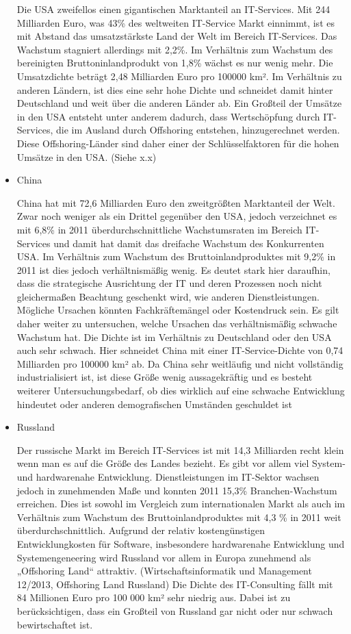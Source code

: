 \begin{itemize}
Die USA zweifellos einen gigantischen Marktanteil an IT-Services. Mit 244 Milliarden Euro, was 43\% des weltweiten IT-Service Markt einnimmt, ist es mit Abstand das umsatzstärkste Land der Welt im Bereich IT-Services. \cite{ibisUSA} Das Wachstum stagniert allerdings mit 2,2\%. Im Verhältnis zum Wachstum des bereinigten Bruttoninlandprodukt von 1,8\% wächst es nur wenig mehr. \cite{statUSA} Die Umsatzdichte beträgt 2,48 Milliarden Euro pro 100000 km². Im Verhältnis zu anderen Ländern, ist dies eine sehr hohe Dichte und schneidet damit hinter Deutschland und weit über die anderen Länder ab.
Ein Großteil der Umsätze in den USA entsteht unter anderem dadurch, dass Wertschöpfung durch IT-Services, die im Ausland durch Offshoring entstehen, hinzugerechnet werden. Diese Offshoring-Länder sind daher einer der Schlüsselfaktoren für die hohen Umsätze in den USA. (Siehe x.x)

\item {China}

China hat mit 72,6 Milliarden Euro den zweitgrößten Marktanteil der Welt. Zwar noch weniger als ein Drittel gegenüber den USA, jedoch verzeichnet es mit 6,8\% in 2011 überdurchschnittliche Wachstumsraten im Bereich IT-Services und damit hat damit das dreifache Wachstum des Konkurrenten USA.  Im Verhältnis zum  Wachstum des Bruttoinlandproduktes mit 9,2\% in 2011 ist dies jedoch verhältnismäßig wenig. Es deutet stark hier daraufhin, dass die strategische Ausrichtung der IT und deren Prozessen noch nicht  gleichermaßen Beachtung geschenkt wird, wie anderen Dienstleistungen. Mögliche Ursachen könnten Fachkräftemängel oder Kostendruck sein. Es gilt daher weiter zu untersuchen, welche Ursachen das verhältnismäßig schwache Wachstum hat. Die Dichte ist im Verhältnis zu Deutschland oder den USA auch sehr schwach. Hier schneidet China mit einer IT-Service-Dichte von 0,74 Milliarden pro 100000 km² ab. Da China sehr weitläufig und nicht vollständig industrialisiert ist, ist diese Größe wenig aussagekräftig und es besteht weiterer Untersuchungsbedarf, ob dies wirklich auf eine schwache Entwicklung hindeutet oder anderen demografischen Umständen geschuldet ist \cite{ibisChina}

\item {Russland}

Der russische Markt im Bereich IT-Services ist mit 14,3 Milliarden recht klein wenn man es auf die Größe des Landes bezieht. Es gibt vor allem viel System- und hardwarenahe Entwicklung. Dienstleistungen im IT-Sektor wachsen jedoch in zunehmenden Maße und konnten 2011 15,3\% Branchen-Wachstum erreichen. Dies ist sowohl im Vergleich zum internationalen Markt als auch im Verhältnis zum Wachstum des Bruttoinlandproduktes mit 4,3 \% in 2011 weit überdurchschnittlich. \cite{statRus2} Aufgrund der relativ kostengünstigen Entwicklungkosten für Software, insbesondere hardwarenahe Entwicklung und Systemengeneering wird Russland vor allem in Europa  zunehmend als „Offshoring Land“ attraktiv. (Wirtschaftsinformatik und Management 12/2013, Offshoring Land Russland)
Die Dichte des IT-Consulting fällt mit 84 Millionen Euro pro 100 000 km² sehr niedrig aus. Dabei ist zu berücksichtigen, dass ein Großteil von Russland gar nicht oder nur schwach bewirtschaftet ist. \cite{statRus}



\end{itemize}
